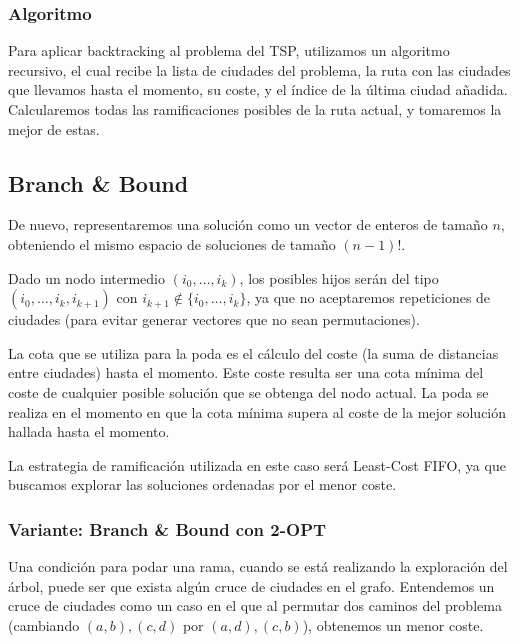 \documentclass[a4paper, 11pt]{article} %
\begin{document}
    \subsubsection{Algoritmo}
    
    Para aplicar backtracking al problema del TSP, utilizamos un algoritmo recursivo, el cual recibe la lista de 
    ciudades del problema, la ruta con las ciudades que llevamos hasta el momento, su coste, y el índice de la 
    última ciudad añadida. Calcularemos todas las ramificaciones posibles de la ruta actual, y tomaremos la mejor 
    de estas. 
    
    
    \small
    \texttt{}
    \normalsize
    
    \subsection{Branch \& Bound}
      De nuevo, representaremos una solución como un vector de enteros de tamaño $n$, obteniendo el mismo espacio de soluciones de tamaño $(n-1)!$.
      
      Dado un nodo intermedio $(i_0, \dots, i_k)$, los posibles hijos serán del tipo\\ $(i_0, \dots, i_k, i_{k+1})$ con $i_{k+1} \notin \{i_0, \dots, i_k\}$, 
      ya que no aceptaremos repeticiones de ciudades (para evitar generar vectores que no sean permutaciones).
      
      La cota que se utiliza para la poda es el cálculo del coste (la suma de distancias entre ciudades) hasta el momento. Este coste resulta ser una cota 
      mínima del coste de cualquier posible solución que se obtenga del nodo actual.
      La poda se realiza en el momento en que la cota mínima supera al coste de la mejor solución hallada hasta el momento.
      
      La estrategia de ramificación utilizada en este caso será Least-Cost FIFO, ya que buscamos explorar las soluciones ordenadas por el menor coste.
      
      \subsubsection{Variante: Branch \& Bound con 2-OPT}
	Una condición para podar una rama, cuando se está realizando la exploración del árbol, puede ser que exista algún cruce de ciudades en el grafo.
	Entendemos un cruce de ciudades como un caso en el que al permutar dos caminos del problema (cambiando $(a,b),(c,d)$ por $(a,d),(c,b)$), obtenemos
	un menor coste.
	
\end{document}
